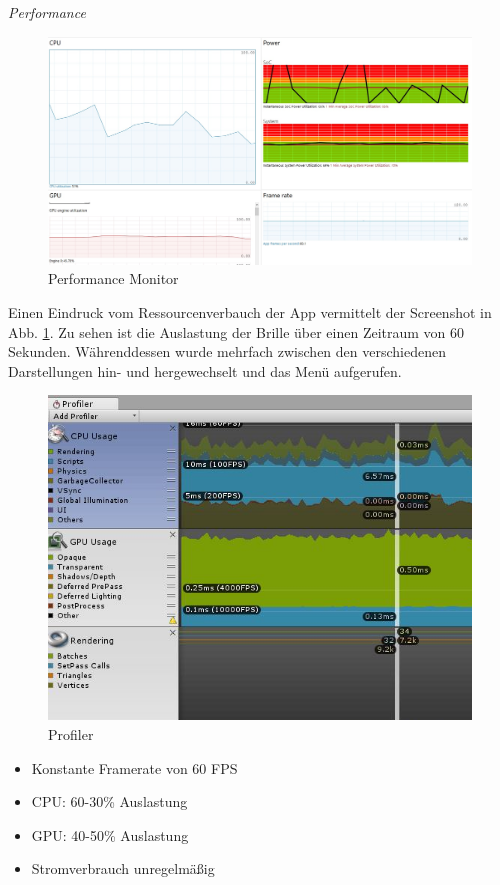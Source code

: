 \textit{Performance}
\begin{figure}[h!]
	\centering
	\includegraphics[width=\textwidth]{images/performance.jpg}
	\caption{Performance Monitor}
	\label{img:performance}
\end{figure}

Einen Eindruck vom Ressourcenverbauch der App vermittelt der Screenshot in Abb. \ref{img:performance}. Zu sehen ist die Auslastung der Brille über einen Zeitraum von 60 Sekunden. Währenddessen wurde mehrfach zwischen den verschiedenen Darstellungen hin- und hergewechselt und das Menü aufgerufen.

\begin{figure}[h!]
	\centering
	\includegraphics[width=\textwidth]{images/profiler.png}
	\caption{Profiler}
	\label{img:profiler}
\end{figure}

\begin{itemize}
	\setlength{\itemsep}{-1pt}
	\singlespacing
	\item Konstante Framerate von 60 FPS
	\item CPU: 60-30\% Auslastung
	\item GPU: 40-50\% Auslastung
	\item Stromverbrauch unregelmäßig
\end{itemize}

